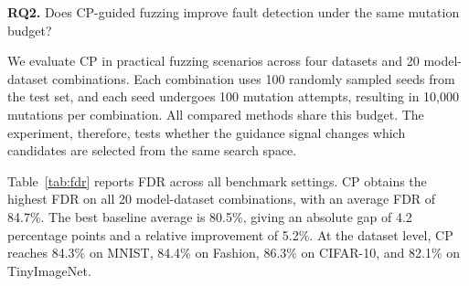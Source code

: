 \documentclass[preprint,number,5p,twocolumn]{elsarticle}
\begin{document}
\begin{rqbox}
\textbf{RQ2.} Does CP-guided fuzzing improve fault detection under the same mutation budget?
\end{rqbox}

We evaluate CP in practical fuzzing scenarios across four datasets and 20 model-dataset combinations. Each combination uses 100 randomly sampled seeds from the test set, and each seed undergoes 100 mutation attempts, resulting in 10,000 mutations per combination. All compared methods share this budget. The experiment, therefore, tests whether the guidance signal changes which candidates are selected from the same search space.

Table~\ref{tab:fdr} reports FDR across all benchmark settings. CP obtains the highest FDR on all 20 model-dataset combinations, with an average FDR of 84.7\%. The best baseline average is 80.5\%, giving an absolute gap of 4.2 percentage points and a relative improvement of 5.2\%. At the dataset level, CP reaches 84.3\% on MNIST, 84.4\% on Fashion, 86.3\% on CIFAR-10, and 82.1\% on TinyImageNet.
\end{document}
